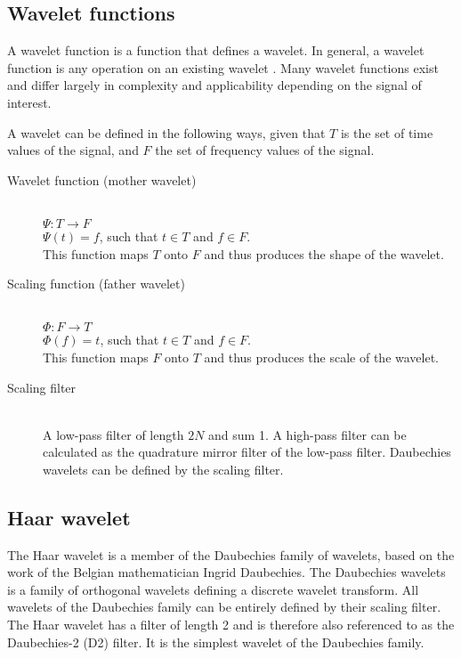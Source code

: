 \subsection{Wavelet functions}
A wavelet function is a function that defines a wavelet. In general, a wavelet
function is any operation on an existing wavelet \cite{wadkar}. Many wavelet
functions exist and differ largely in complexity and applicability depending on
the signal of interest.

A wavelet can be defined in the following ways, given that $T$ is the set of
time values of the signal, and $F$ the set of frequency values of the signal.
\begin{description}
	\item[Wavelet function (mother wavelet)] \hfill \\ $\Psi: T \longrightarrow
	F$\\ $\Psi(t) = f$, such that $t \in T$ and $f \in F$.\\
	This function maps $T$ onto $F$ and thus produces the shape of the wavelet.

	\item[Scaling function (father wavelet)] \hfill \\ $\Phi: F \longrightarrow
	T$\\ $\Phi(f) = t$, such that $t \in T$ and $f \in F$.\\
	This function maps $F$ onto $T$ and thus produces the scale of the wavelet.

	\item[Scaling filter] \hfill \\ A low-pass filter of length $2N$ and sum 1. A
	high-pass filter can be calculated as the quadrature mirror filter of the
	low-pass filter. Daubechies wavelets can be defined by the scaling filter.
\end{description}

\subsection{Haar wavelet}
The Haar wavelet is a member of the Daubechies family of wavelets, based on the
work of the Belgian mathematician Ingrid Daubechies. The Daubechies wavelets is
a family of orthogonal wavelets defining a discrete wavelet transform. All
wavelets of the Daubechies family can be entirely defined by their scaling
filter. The Haar wavelet has a filter of length 2 and is therefore also
referenced to as the Daubechies-2 (D2) filter. It is the simplest wavelet of
the Daubechies family.

